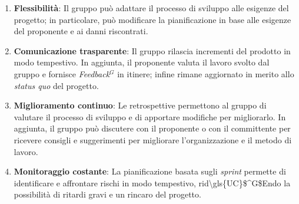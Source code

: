 \begin{enumerate}
	\item \textbf{Flessibilità}: Il gruppo può adattare il processo di sviluppo
	      alle esigenze del progetto; in particolare, può modificare la
	      pianificazione in base alle esigenze del proponente e ai danni
	      riscontrati.

	\item \textbf{Comunicazione trasparente}: Il gruppo rilascia incrementi del
	      prodotto in modo tempestivo. In aggiunta, il proponente valuta il
	      lavoro svolto dal gruppo e fornisce \textit{\gls{Feedback}$^G$} in itinere;
	      infine rimane aggiornato in merito allo \textit{status quo} del
	      progetto.

	\item \textbf{Miglioramento continuo}: Le retrospettive permettono al
	      gruppo di valutare il processo di sviluppo e di apportare
	      modifiche per migliorarlo. In aggiunta, il gruppo può
	      discutere con il proponente o con il committente per ricevere consigli
	      e suggerimenti per migliorare l'organizzazione e il metodo di lavoro.

	\item \textbf{Monitoraggio costante}: La pianificazione basata sugli
	      \textit{sprint} permette di identificare e affrontare rischi in modo
	      tempestivo, rid\gls{\gls{UC}$^G$E}ndo la possibilità di ritardi gravi e un rincaro del
	      progetto.
\end{enumerate}
